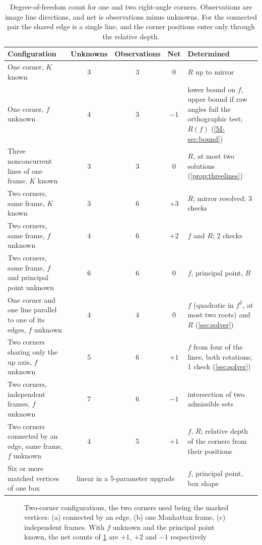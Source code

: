 \begin{table}[t]
\centering\small
\caption{Degree-of-freedom count for one and two right-angle corners. Observations are image line directions, and net is observations minus unknowns. For the connected pair the shared edge is a single line, and the corner positions enter only through the relative depth.}
\label{tab:counts}
\begin{tabularx}{\linewidth}{>{\raggedright\arraybackslash}X c c c >{\raggedright\arraybackslash}X}
\toprule
Configuration & Unknowns & Observations & Net & Determined \\
\midrule
One corner, $K$ known & 3 & 3 & 0 & $R$ up to mirror \citep{kanatani1988} \\
One corner, $f$ unknown & 4 & 3 & $-1$ & lower bound on $f$, upper bound if raw angles fail the orthographic test; $R(f)$ (\cref{M-sec:bound}) \\
Three nonconcurrent lines of one frame, $K$ known & 3 & 3 & 0 & $R$, at most two solutions (\cref{prop:threelines}) \\
Two corners, same frame, $K$ known & 3 & 6 & $+3$ & $R$; mirror resolved; 3 checks \\
Two corners, same frame, $f$ unknown & 4 & 6 & $+2$ & $f$ and $R$; 2 checks \\
Two corners, same frame, $f$ and principal point unknown & 6 & 6 & 0 & $f$, principal point, $R$ \citep{caprile1990} \\
One corner and one line parallel to one of its edges, $f$ unknown & 4 & 4 & 0 & $f$ (quadratic in $f^2$, at most two roots) and $R$ (\cref{sec:solver}) \\
Two corners sharing only the up axis, $f$ unknown & 5 & 6 & $+1$ & $f$ from four of the lines, both rotations; 1 check (\cref{sec:solver}) \\
Two corners, independent frames, $f$ unknown & 7 & 6 & $-1$ & intersection of two admissible sets \\
Two corners connected by an edge, same frame, $f$ unknown & 4 & 5 & $+1$ & $f$, $R$; relative depth of the corners from their positions \\
Six or more matched vertices of one box & \multicolumn{3}{c}{linear in a 5-parameter upgrade} & $f$, principal point, box shape \citep{wilczkowiak2001} \\
\bottomrule
\end{tabularx}
\end{table}

\begin{figure}[t]
\centering

\caption{Two-corner configurations, the two corners used being the marked vertices: (a) connected by an edge, (b) one Manhattan frame, (c) independent frames. With $f$ unknown and the principal point known, the net counts of \cref{tab:counts} are $+1$, $+2$ and $-1$ respectively}
\label{fig:configs}
\end{figure}

